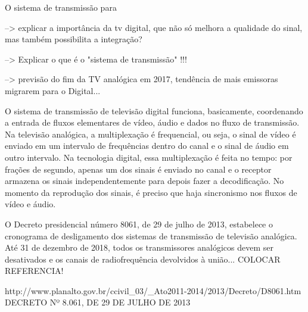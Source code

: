\documentclass[
	12pt,				%
	openright,			%
	twoside,			%
	a4paper,			%
	brazil,
	french,				%
	english
	]{abntex2}
\begin{document}
O sistema de transmissão para 

--> explicar a importância da tv digital, que não só melhora a qualidade do sinal, mas também possibilita 
a integração?

 --> Explicar o que é o "sistema de transmissão" !!!
 
 --> previsão do fim da TV analógica em 2017, tendência de mais emissoras migrarem para o Digital...
 
O sistema de transmissão de televisão digital funciona, basicamente, coordenando a entrada de fluxos elementares de
vídeo, áudio e dados no fluxo de transmissão. Na televisão analógica, a multiplexação é frequencial, ou seja, o sinal
de vídeo é enviado em um intervalo de frequências dentro do canal e o sinal de áudio em outro intervalo. Na tecnologia
digital, essa multiplexação é feita no tempo: por frações de segundo, apenas um dos sinais é enviado no canal e o
receptor armazena os sinais independentemente para depois fazer a decodificação. No momento da reprodução dos
sinais, é preciso que haja sincronismo nos fluxos de vídeo e áudio.

O Decreto presidencial número 8061, de 29 de julho de 2013, estabelece o cronograma de desligamento dos sistemas
de transmissão de televisão analógica. Até 31 de dezembro de 2018, todos os transmissores analógicos devem ser desativados
e os canais de radiofrequência devolvidos à união... COLOCAR REFERENCIA! 

http://www.planalto.gov.br/ccivil_03/_Ato2011-2014/2013/Decreto/D8061.htm
DECRETO Nº 8.061, DE 29 DE JULHO DE 2013

\end{document}
